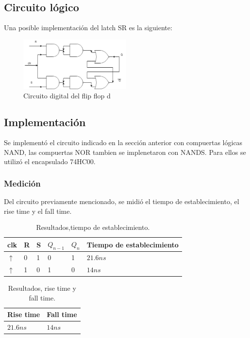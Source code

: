 \documentclass[../../e3_tp2_main.tex]{subfiles}
\begin{document}
\subsection{Circuito lógico}
Una posible implementación del latch SR es la siguiente:
\begin{figure}[H]	
	\centering
	\includegraphics[width=0.5\textwidth]{imagenes/lsr_cd.png}
	\caption{Circuito digital del flip flop d}
\end{figure}

\subsection{Implementación}
Se implementó el circuito indicado en la sección anterior con compuertas lógicas NAND, las compuertas NOR tambien se implenetaron con NANDS. Para ellos se utilizó el encapsulado 74HC00.
\subsubsection{Medición}
Del circuito previamente mencionado, se midió el tiempo de establecimiento, el rise time y el fall time. 

\begin{table}[h]
\begin{center}
\begin{tabular}{|l|l|l|l|l|l|}
\hline
clk& R&S & $Q_{n-1}$ & $Q_n$ &Tiempo de establecimiento\\
\hline \hline
$\uparrow$ &0 & 1 &0&1&$21.6 n s$  \\ \hline
$\uparrow$ &1 & 0 &1&0&$14 n s$  \\ \hline

\end{tabular}
\caption{Resultados,tiempo de establecimiento.} 
\end{center}
\end{table}

\begin{table}[h]
\begin{center}
\begin{tabular}{|l|l|}
\hline
Rise time& Fall time \\
\hline \hline
$21.6 n s$  & $14 n s$ \\ \hline
\end{tabular}
\caption{Resultados, rise time y fall time.} 
\end{center}
\end{table}
\end{document}

